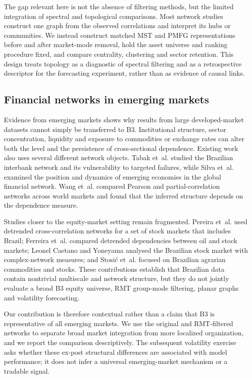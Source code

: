 The gap relevant here is not the absence of filtering methods, but the limited integration of spectral and topological comparisons. Most network studies construct one graph from the observed correlations and interpret its hubs or communities. We instead construct matched MST and PMFG representations before and after market-mode removal, hold the asset universe and ranking procedure fixed, and compare centrality, clustering and sector retention. This design treats topology as a diagnostic of spectral filtering and as a retrospective descriptor for the forecasting experiment, rather than as evidence of causal links.

\subsection{Financial networks in emerging markets}

Evidence from emerging markets shows why results from large developed-market datasets cannot simply be transferred to B3. Institutional structure, sector concentration, liquidity and exposure to commodities or exchange rates can alter both the level and the persistence of cross-sectional dependence. Existing work also uses several different network objects. Tabak et~al. \cite{tabak_2010_topology} studied the Brazilian interbank network and its vulnerability to targeted failures, while Silva et~al. \cite{silva_2016_structure} examined the position and dynamics of emerging economies in the global financial network. Wang et~al. \cite{wang_2018_correlation} compared Pearson and partial-correlation networks across world markets and found that the inferred structure depends on the dependence measure.

Studies closer to the equity-market setting remain fragmented. Pereira et~al. \cite{pereira_2019_multiscale} used detrended cross-correlation networks for a set of stock markets that includes Brazil; Ferreira et~al. \cite{ferreira_2019_detrended} compared detrended dependencies between oil and stock markets; Leonel Caetano and Yoneyama \cite{leonel_2022_brazilian} analysed the Brazilian stock market with complex-network measures; and Stosi{\'c} et~al. \cite{stosic_2015_correlations} focused on Brazilian agrarian commodities and stocks. These contributions establish that Brazilian data contain nontrivial multiscale and network structure, but they do not jointly evaluate a broad B3 equity universe, RMT group-mode filtering, planar graphs and volatility forecasting.

Our contribution is therefore contextual rather than a claim that B3 is representative of all emerging markets. We use the original and RMT-filtered networks to separate broad market integration from more localized organization, and we report the comparison descriptively. The subsequent volatility exercise asks whether these ex-post structural differences are associated with model performance; it does not infer a universal emerging-market mechanism or a tradable signal.

